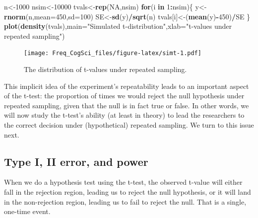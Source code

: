 \documentclass[12pt,]{krantz}
\newenvironment{Shaded}{\begin{snugshade}}{\end{snugshade}}
\newcommand{\ControlFlowTok}[1]{\textcolor[rgb]{0.13,0.29,0.53}{\textbf{#1}}}
\newcommand{\DataTypeTok}[1]{\textcolor[rgb]{0.13,0.29,0.53}{#1}}
\newcommand{\DecValTok}[1]{\textcolor[rgb]{0.00,0.00,0.81}{#1}}
\newcommand{\KeywordTok}[1]{\textcolor[rgb]{0.13,0.29,0.53}{\textbf{#1}}}
\newcommand{\NormalTok}[1]{#1}
\newcommand{\OperatorTok}[1]{\textcolor[rgb]{0.81,0.36,0.00}{\textbf{#1}}}
\newcommand{\OtherTok}[1]{\textcolor[rgb]{0.56,0.35,0.01}{#1}}
\newcommand{\StringTok}[1]{\textcolor[rgb]{0.31,0.60,0.02}{#1}}
\begin{document}
\begin{Shaded}
\begin{Highlighting}[]
\NormalTok{n<-}\DecValTok{1000}
\NormalTok{nsim<-}\DecValTok{10000}
\NormalTok{tvals<-}\KeywordTok{rep}\NormalTok{(}\OtherTok{NA}\NormalTok{,nsim)}
\ControlFlowTok{for}\NormalTok{(i }\ControlFlowTok{in} \DecValTok{1}\OperatorTok{:}\NormalTok{nsim)\{}
\NormalTok{y<-}\KeywordTok{rnorm}\NormalTok{(n,}\DataTypeTok{mean=}\DecValTok{450}\NormalTok{,}\DataTypeTok{sd=}\DecValTok{100}\NormalTok{)}
\NormalTok{SE<-}\KeywordTok{sd}\NormalTok{(y)}\OperatorTok{/}\KeywordTok{sqrt}\NormalTok{(n)}
\NormalTok{tvals[i]<-(}\KeywordTok{mean}\NormalTok{(y)}\OperatorTok{-}\DecValTok{450}\NormalTok{)}\OperatorTok{/}\NormalTok{SE}
\NormalTok{\}}
\KeywordTok{plot}\NormalTok{(}\KeywordTok{density}\NormalTok{(tvals),}\DataTypeTok{main=}\StringTok{"Simulated t-distribution"}\NormalTok{,}\DataTypeTok{xlab=}\StringTok{"t-values under repeated sampling"}\NormalTok{)}
\end{Highlighting}
\end{Shaded}

\begin{figure}
\centering
\texttt{[image: Freq\_CogSci\_files/figure-latex/simt-1.pdf]}
\caption{\label{fig:simt}The distribution of t-values under repeated sampling.}
\end{figure}

This implicit idea of the experiment's repeatability leads to an important aspect of the t-test: the proportion of times we would reject the null hypothesis under repeated sampling, given that the null is in fact true or false. In other words, we will now study the t-test's ability (at least in theory) to lead the researchers to the correct decision under (hypothetical) repeated sampling. We turn to this issue next.

\hypertarget{type-i-ii-error-and-power}{%
\subsection{Type I, II error, and power}\label{type-i-ii-error-and-power}}

When we do a hypothesis test using the t-test, the observed t-value will either fall in the rejection region, leading us to reject the null hypothesis,
or it will land in the non-rejection region, leading us to fail to reject the null. That is a single, one-time event.
\end{document}
